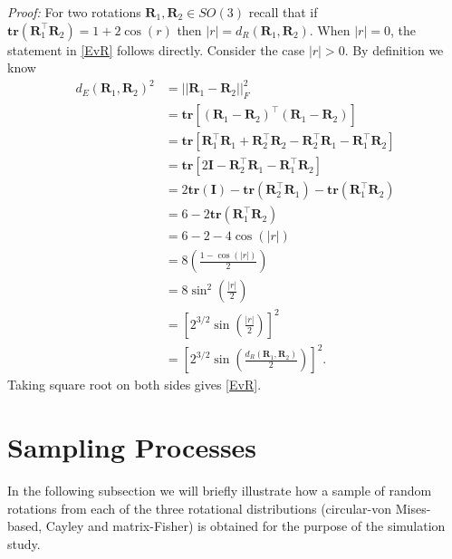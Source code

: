 \documentclass[12pt]{article}
\newcommand{\tr}{{\mathbf{tr}}}
\newcommand{\Rdist}{{d_R}}
\newcommand{\Edist}{{d_E}}
\begin{document}


\noindent \textit{Proof:} For two rotations $\bm{R}_1,\bm{R}_2\in SO(3)$ recall that if $\tr(\bm R_1^\top\bm R_2)=1+2\cos(r)$ then $|r|=\Rdist(\bm R_1,\bm R_2)$.  When $|r|=0$, the statement in \eqref{EvR} follows directly.  Consider the case $|r|>0$.  By definition we know
\begin{align*}
\Edist (\bm R_1,\bm R_2)^2
&=||\bm R_1-\bm R_2||_F^2\\
&=\tr\left[(\bm R_1-\bm R_2)^\top(\bm R_1-\bm R_2)\right]\\
&=\tr\left[\bm R_1^\top\bm R_1+\bm R_2^\top\bm R_2-\bm R_2^\top\bm R_1-\bm R_1^\top\bm R_2\right]\\
&=\tr\left[2\bm{I}-\bm R_2^\top\bm R_1-\bm R_1^\top\bm R_2\right]\\
&=2\tr(\bm{I})-\tr(\bm R_2^\top\bm R_1)-\tr(\bm R_1^\top\bm R_2)\\
&=6-2\tr(\bm R_1^\top\bm R_2)\\
&=6-2-4\cos(|r|)\\
&=8\left(\frac{1-\cos(|r|)}{2}\right)\\
&=8\sin^2\left(\frac{|r|}{2}\right)\\
&=\left[2^{3/2}\sin\left(\frac{|r|}{2}\right)\right]^2\\
&=\left[2^{3/2}\sin\left(\frac{\Rdist(\bm R_1,\bm R_2)}{2}\right)\right]^2.
\end{align*}
Taking square root on both sides gives \eqref{EvR}.

\section{Sampling Processes}
In the following subsection we will briefly illustrate how a sample of random rotations from each of the three rotational distributions (circular-von Mises-based, Cayley and matrix-Fisher) is obtained for the purpose of the simulation study.
\label{sec:appendix1}
\end{document}
